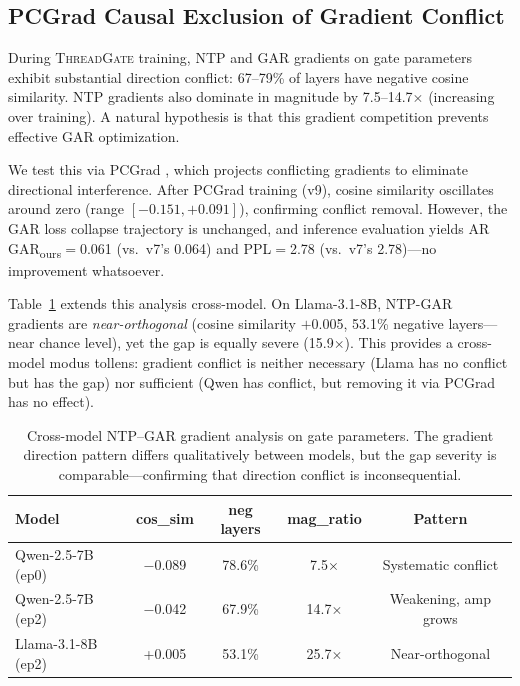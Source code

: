 \documentclass[11pt]{article}
\newcommand{\gar}{\textsc{GAR}}
\newcommand{\garours}{\textsc{GAR}\textsubscript{ours}}
\newcommand{\tg}{\textsc{ThreadGate}}
\begin{document}
\subsection{PCGrad Causal Exclusion of Gradient Conflict}

During \tg{} training, NTP and \gar{} gradients on gate parameters exhibit substantial direction conflict: 67--79\% of layers have negative cosine similarity. NTP gradients also dominate in magnitude by 7.5--14.7$\times$ (increasing over training). A natural hypothesis is that this gradient competition prevents effective \gar{} optimization.

We test this via PCGrad \citep{yu2020gradient}, which projects conflicting gradients to eliminate directional interference. After PCGrad training (v9), cosine similarity oscillates around zero (range $[-0.151, +0.091]$), confirming conflict removal. However, the \gar{} loss collapse trajectory is unchanged, and inference evaluation yields AR \garours{}$=$0.061 (vs.\ v7's 0.064) and PPL$=$2.78 (vs.\ v7's 2.78)---no improvement whatsoever.

Table~\ref{tab:gradient} extends this analysis cross-model. On Llama-3.1-8B, NTP-\gar{} gradients are \emph{near-orthogonal} (cosine similarity $+$0.005, 53.1\% negative layers---near chance level), yet the gap is equally severe (15.9$\times$). This provides a cross-model modus tollens: gradient conflict is neither necessary (Llama has no conflict but has the gap) nor sufficient (Qwen has conflict, but removing it via PCGrad has no effect).

\begin{table}[t]
\centering
\small
\caption{Cross-model NTP--\gar{} gradient analysis on gate parameters. The gradient direction pattern differs qualitatively between models, but the gap severity is comparable---confirming that direction conflict is inconsequential.}
\label{tab:gradient}
\begin{tabular}{lcccc}
\toprule
\textbf{Model} & \textbf{cos\_sim} & \textbf{neg layers} & \textbf{mag\_ratio} & \textbf{Pattern} \\
\midrule
Qwen-2.5-7B (ep0) & $-$0.089 & 78.6\% & 7.5$\times$ & Systematic conflict \\
Qwen-2.5-7B (ep2) & $-$0.042 & 67.9\% & 14.7$\times$ & Weakening, amp grows \\
Llama-3.1-8B (ep2) & +0.005 & 53.1\% & 25.7$\times$ & Near-orthogonal \\
\bottomrule
\end{tabular}
\end{table}
\end{document}
